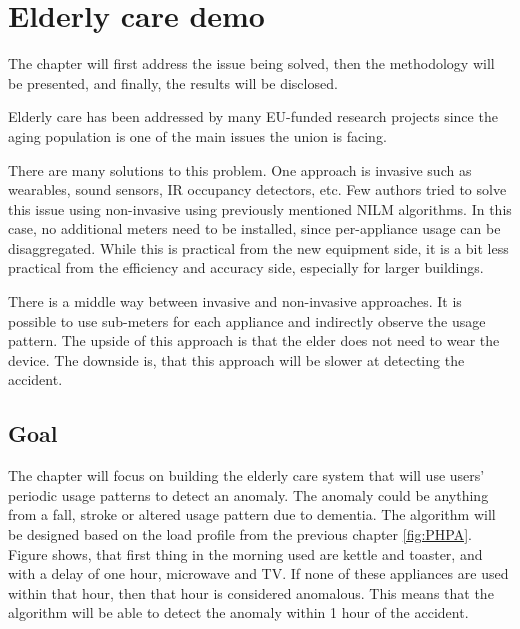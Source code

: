
\chapter{Elderly care demo} %

\label{Chapter7} %

The chapter will first address the issue being solved,
then the methodology will be presented, and finally,
the results will be disclosed.

Elderly care has been addressed by many EU-funded research projects since the aging population is one of the main issues the union is facing. 

There are many solutions to this problem.
One approach is invasive such as wearables, sound sensors, IR occupancy detectors, etc. 
Few authors tried to solve this issue using non-invasive using previously mentioned NILM algorithms. 
In this case, no additional meters need to be installed, since per-appliance usage can be disaggregated.
While this is practical from the new equipment side, it is a bit less practical from the efficiency and accuracy side, especially for larger buildings. 

There is a middle way between invasive and non-invasive approaches. 
It is possible to use sub-meters for each appliance and indirectly observe the usage pattern. 
The upside of this approach is that the elder does not need to wear the device.
The downside is, that this approach will be slower at detecting the accident.

\section{Goal}

The chapter will focus on building the elderly care system that will use users' periodic usage patterns to detect an anomaly.
The anomaly could be anything from a fall, stroke or altered usage pattern due to dementia. 
The algorithm will be designed based on the load profile from the previous chapter \ref{fig:PHPA}.
Figure shows, that first thing in the morning used are kettle and toaster, and with a delay of one hour, microwave and TV. 
If none of these appliances are used within that hour, then that hour is considered anomalous.
This means that the algorithm will be able to detect the anomaly within 1 hour of the accident.

